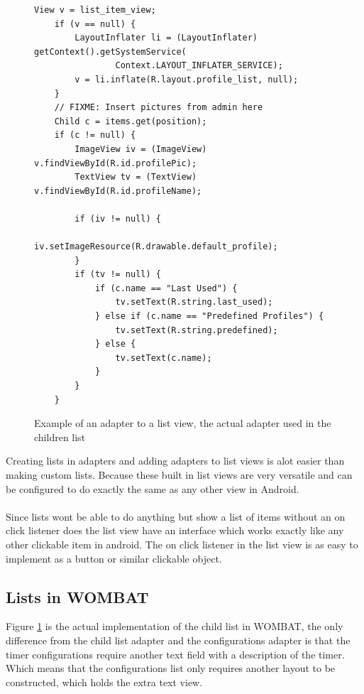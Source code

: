 \begin{figure}[H]
	\centering
	\begin{lstlisting}
View v = list_item_view;
	if (v == null) {
		LayoutInflater li = (LayoutInflater) getContext().getSystemService(
				Context.LAYOUT_INFLATER_SERVICE);
		v = li.inflate(R.layout.profile_list, null);
	}
	// FIXME: Insert pictures from admin here
	Child c = items.get(position);
	if (c != null) {
		ImageView iv = (ImageView) v.findViewById(R.id.profilePic);
		TextView tv = (TextView) v.findViewById(R.id.profileName);

		if (iv != null) {
			iv.setImageResource(R.drawable.default_profile);
		}
		if (tv != null) {
			if (c.name == "Last Used") {
				tv.setText(R.string.last_used);
			} else if (c.name == "Predefined Profiles") {
				tv.setText(R.string.predefined);
			} else {
				tv.setText(c.name);
			}
		}
	}
\end{lstlisting}
	\caption{Example of an adapter to a list view, the actual adapter used in the children list}%
	\label{code:listview_adapter_example}%
\end{figure}

Creating lists in adapters and adding adapters to list views is alot easier than making custom lists. 
Because these built in list views are very versatile and can be configured to do exactly the same as any other view in Android.\\
\\

Since lists wont be able to do anything but show a list of items without an on click listener does the list view have an interface which works exactly like any other clickable item in android.
The on click listener in the list view is as easy to implement as a button or similar clickable object.

\subsection{Lists in WOMBAT}
Figure \ref{code:listview_adapter_example} is the actual implementation of the child list in WOMBAT, the only difference from the child list adapter and the configurations adapter is that the timer configurations require another text field with a description of the timer.
Which means that the configurations list only requires another layout to be constructed, which holds the extra text view.\\
\\

